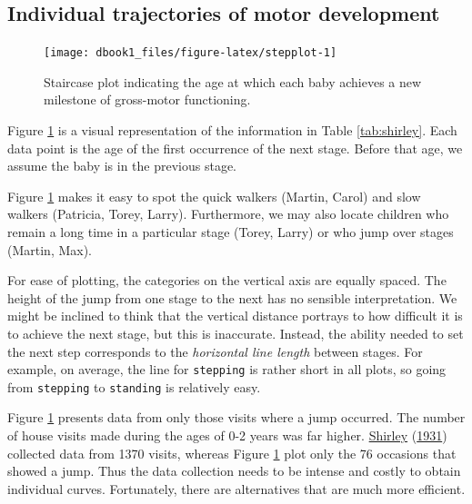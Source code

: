 \documentclass[
]{book}
\begin{document}
\hypertarget{individual-trajectories-of-motor-development}{%
\subsection{Individual trajectories of motor development}\label{individual-trajectories-of-motor-development}}

\begin{figure}

{\centering \texttt{[image: dbook1\_files/figure-latex/stepplot-1]} 

}

\caption{Staircase plot indicating the age at which each baby achieves a new milestone of gross-motor functioning.}\label{fig:stepplot}
\end{figure}



Figure \ref{fig:stepplot} is a visual representation of the information in Table \ref{tab:shirley}. Each data point is the age of the first occurrence of the next stage. Before that age, we assume the baby is in the previous stage.

Figure \ref{fig:stepplot} makes it easy to spot the quick walkers (Martin, Carol) and slow walkers (Patricia, Torey, Larry). Furthermore, we may also locate children who remain a long time in a particular stage (Torey, Larry) or who jump over stages (Martin, Max).

For ease of plotting, the categories on the vertical axis are equally spaced. The height of the jump from one stage to the next has no sensible interpretation. We might be inclined to think that the vertical distance portrays to how difficult it is to achieve the next stage, but this is inaccurate. Instead, the ability needed to set the next step corresponds to the \emph{horizontal line length} between stages. For example, on average, the line for \texttt{stepping} is rather short in all plots, so going from \texttt{stepping} to \texttt{standing} is relatively easy.

Figure \ref{fig:stepplot} presents data from only those visits where a jump occurred. The number of house visits made during the ages of 0-2 years was far higher. \protect\hyperlink{ref-shirley1931}{Shirley} (\protect\hyperlink{ref-shirley1931}{1931}) collected data from 1370 visits, whereas Figure \ref{fig:stepplot} plot only the 76 occasions that showed a jump. Thus the data collection needs to be intense and costly to obtain individual curves. Fortunately, there are alternatives that are much more efficient.
\end{document}
